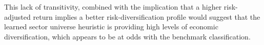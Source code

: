 \documentclass[../main.tex]{subfiles}
\begin{document}
This lack of transitivity, combined with the implication that a higher risk-adjusted return implies a better risk-diversification profile would suggest that the learned sector universe heuristic is providing high levels of economic diversification, which appears to be at odds with the benchmark classification.
\end{document}
